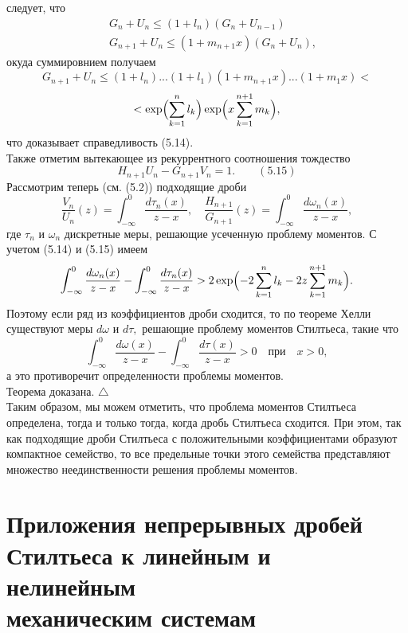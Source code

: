 \documentclass[12pt,a4paper]{article}
\theoremstyle{plain}   \newtheorem{Pro}{Задача}
\begin{document}
следует, что
\begin{align*}
  \; & G_n +U_n \leqslant (1+l_n )
    (G_n +U_{n-1}) \\
  \; & G_{n+1}+U_n \leqslant (1+m_{n+1}x )
    (G_n +U_n ) ,
\end{align*}
окуда суммировнием получаем
$$
  G_{n+1}+U_n \leqslant (1+l_n )...(1+l_1 )
    (1+m_{n+1}x)...(1+m_1 x) <
$$
$$
  < \exp \Bigl ( \sum _{k=1}^n l_k \Bigr )
    \exp \Bigl ( x \sum _{k=1}^{n+1} m_k \Bigr ) ,
$$
что доказывает справедливость (5.14).\\
Также отметим вытекающее из рекуррентного соотношения
тождество
$$
  H_{n+1}U_n -G_{n+1}V_n =1. \qquad (5.15)
$$
Рассмотрим теперь (см. (5.2)) подходящие дроби
$$
  \frac{V_n}{U_n}(z)=\int _{-\infty}^0
    \frac{d\tau _n (x)}{z-x}, \quad
	  \frac{H_{n+1}}{G_{n+1}}(z)=
	    \int _{-\infty}^0
		  \frac{d \omega _n (x)}{z-x},
$$
где
$ \tau _n $
и
$ \omega _n $
дискретные меры, решающие усеченную проблему моментов.
С учетом (5.14) и (5.15) имеем
$$
  \int _{-\infty}^0 \frac{d\omega _n (x)}{z-x}-
    \int _{-\infty}^0 \frac{d\tau _n (x)}{z-x} >
	  2 \exp \Bigl ( -2 \sum _{k=1}^n l_k -
	    2z \sum _{k=1}^{n+1} m_k \Bigr ) .
$$
Поэтому если ряд из коэффициентов дроби сходится, то
по теореме Хелли существуют меры
$ d \omega $
и
$ d \tau , $
решающие проблему моментов Стилтьеса, такие что
$$
  \int _{-\infty}^0 \frac{d\omega (x)}{z-x} -
  \int _{-\infty}^0 \frac{d\tau (x)}{z-x} >0
  \quad \mathrm{при} \quad x>0,
$$
а это противоречит определенности проблемы моментов.\\
Теорема доказана. $ \triangle $\\
Таким образом, мы можем отметить, что проблема
моментов Стилтьеса определена,
тогда и только тогда, когда
дробь Стилтьеса сходится.
При этом, так как подходящие дроби Стилтьеса
с положительными коэффициентами
образуют компактное семейство,
то все предельные точки этого семейства
представляют множество неединственности
решения проблемы моментов.
\newpage
\section{Приложения непрерывных дробей \\
Стилтьеса к линейным
и нелинейным \\
механическим системам}
\end{document}
